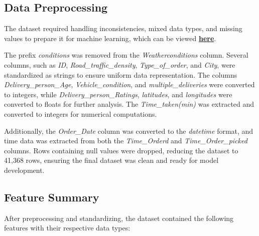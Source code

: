 \documentclass[10pt,twocolumn,letterpaper]{article}
\begin{document}
    \subsection{Data Preprocessing}
        The dataset required handling inconsistencies, mixed data types, and missing values to prepare it for machine learning, which can be viewed \href{ https://github.com/Vikranth3140/ML-Project/blob/main/pre-processing.py}{\textbf{here}}.

        The prefix \textit{conditions} was removed from the \textit{Weatherconditions} column. Several columns, such as \textit{ID}, \textit{Road\_traffic\_density}, \textit{Type\_of\_order}, and \textit{City}, were standardized as strings to ensure uniform data representation. The columns \textit{Delivery\_person\_Age}, \textit{Vehicle\_condition}, and \textit{multiple\_deliveries} were converted to integers, while \textit{Delivery\_person\_Ratings}, \textit{latitudes}, and \textit{longitudes} were converted to floats for further analysis. The \textit{Time\_taken(min)} was extracted and converted to integers for numerical computations.

        Additionally, the \textit{Order\_Date} column was converted to the \textit{datetime} format, and time data was extracted from both the \textit{Time\_Orderd} and \textit{Time\_Order\_picked} columns. Rows containing null values were dropped, reducing the dataset to 41,368 rows, ensuring the final dataset was clean and ready for model development.

    \subsection{Feature Summary}
        After preprocessing and standardizing, the dataset contained the following features with their respective data types:
\end{document}
